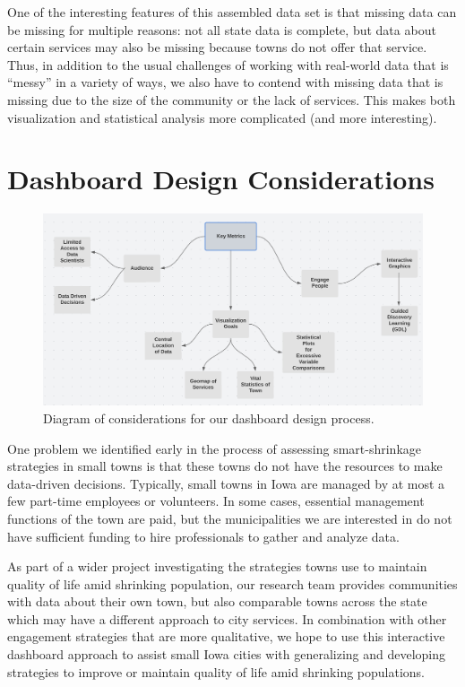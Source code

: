 \documentclass[letterpaper,inpress]{jdsart}
\begin{document}
One of the interesting features of this assembled data set is that missing data can be missing for multiple reasons: not all state data is complete, but data about certain services may also be missing because towns do not offer that service.
Thus, in addition to the usual challenges of working with real-world data that is ``messy'' in a variety of ways, we also have to contend with missing data that is missing due to the size of the community or the lack of services. This makes both visualization and statistical analysis more complicated (and more interesting).

\hypertarget{dashboard-design-considerations}{%
\section{Dashboard Design Considerations}\label{dashboard-design-considerations}}

\begin{figure}
\includegraphics[width=.8\textwidth]{Key_Metrics}
\caption{Diagram of considerations for our dashboard design process.}\label{fig:metrics}
\end{figure}

One problem we identified early in the process of assessing smart-shrinkage strategies in small towns is that these towns do not have the resources to make data-driven decisions. Typically, small towns in Iowa are managed by at most a few part-time employees or volunteers. In some cases, essential management functions of the town are paid, but the municipalities we are interested in do not have sufficient funding to hire professionals to gather and analyze data.

As part of a wider project investigating the strategies towns use to maintain quality of life amid shrinking population, our research team provides communities with data about their own town, but also comparable towns across the state which may have a different approach to city services. In combination with other engagement strategies that are more qualitative, we hope to use this interactive dashboard approach to assist small Iowa cities with generalizing and developing strategies to improve or maintain quality of life amid shrinking populations.
\end{document}
